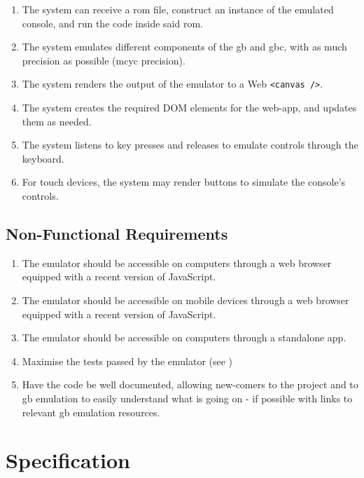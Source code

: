\documentclass[11pt]{report}
\begin{document}
\begin{enumerate}[start=1,label=F\arabic*.]
    \item The system can receive a \gls{rom} file, construct an instance of the emulated console, and run the code inside said \gls{rom}.
    \item The system emulates different components of the \gls{gb} and \gls{gbc}, with as much precision as possible (\gls{mcyc} precision).
    \item The system renders the output of the emulator to a Web \texttt{<canvas />}.
    \item The system creates the required DOM elements for the web-app, and updates them as needed.
    \item The system listens to key presses and releases to emulate controls through the keyboard.
    \item For touch devices, the system may render buttons to simulate the console's controls.
\end{enumerate}

\subsection{Non-Functional Requirements}

\begin{enumerate}[start=1,label=N\arabic*.]
    \item The emulator should be accessible on computers through a web browser equipped with a recent version of JavaScript.
    \item The emulator should be accessible on mobile devices through a web browser equipped with a recent version of JavaScript.
    \item The emulator should be accessible on computers through a standalone app.
    \item Maximise the tests passed by the emulator (see )
    \item Have the code be well documented, allowing new-comers to the project and to \gls{gb} emulation to easily understand what is going on - if possible with links to relevant \glsdesc{gb} emulation resources.
\end{enumerate}


\section{Specification}
\end{document}
